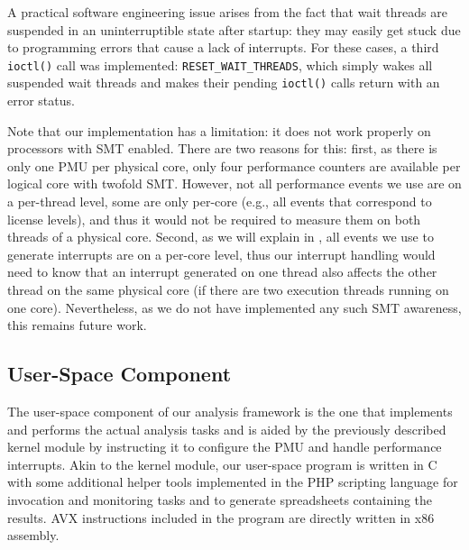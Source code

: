 A practical software engineering issue arises from the fact that wait threads are suspended in an uninterruptible state after startup: they may easily get stuck due to programming errors that cause a lack of interrupts. For these cases, a third \texttt{ioctl()} call was implemented: \texttt{RESET\_WAIT\_THREADS}, which simply wakes all suspended wait threads and makes their pending \texttt{ioctl()} calls return with an error status.

Note that our implementation has a limitation: it does not work properly on processors with \gls{SMT} enabled. There are two reasons for this: first, as there is only one \gls{PMU} per physical core, only four performance counters are available per logical core with twofold \gls{SMT}. However, not all performance events we use are on a per-thread level, some are only per-core (e.g., all events that correspond to license levels), and thus it would not be required to measure them on both threads of a physical core. Second, as we will explain in , all events we use to generate interrupts are on a per-core level, thus our interrupt handling would need to know that an interrupt generated on one thread also affects the other thread on the same physical core (if there are two execution threads running on one core). Nevertheless, as we do not have implemented any such \gls{SMT} awareness, this remains future work.

\subsection{User-Space Component}
\label{sec:analysis:design:userspace}

The user-space component of our analysis framework is the one that implements and performs the actual analysis tasks and is aided by the previously described kernel module by instructing it to configure the \gls{PMU} and handle performance interrupts. Akin to the kernel module, our user-space program is written in C with some additional helper tools implemented in the PHP scripting language for invocation and monitoring tasks and to generate spreadsheets containing the results. \gls{AVX} instructions included in the program are directly written in \gls{x86} assembly.

